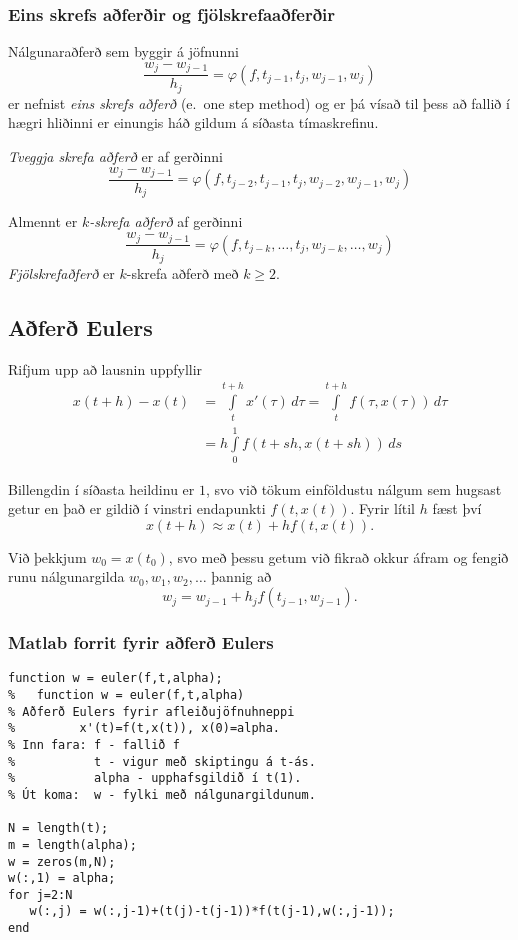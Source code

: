 \documentclass[icelandic,a4paper,12pt]{article}
\begin{document}
\subsubsection{Eins skrefs aðferðir og fjölskrefaaðferðir} 
Nálgunaraðferð sem byggir á jöfnunni
$$
  \dfrac{w_j-w_{j-1}}{h_j}=\varphi(f,t_{j-1},t_j,w_{j-1},w_j)
$$
er nefnist {\it eins skrefs aðferð} (e.~one step method) og er þá
vísað til þess að fallið í hægri hliðinni er einungis háð gildum á
síðasta tímaskrefinu.

\pause
\smallskip
{\it Tveggja skrefa aðferð} er af gerðinni
$$
  \dfrac{w_j-w_{j-1}}{h_j}=\varphi(f,t_{j-2},t_{j-1},t_j,w_{j-2},w_{j-1},w_j)
$$

\pause
\smallskip
Almennt er {\it $k$-skrefa aðferð} af gerðinni
$$
\dfrac{w_j-w_{j-1}}{h_j}=\varphi(f,t_{j-k},\dots,t_j,w_{j-k},\dots,w_j)
$$
{\it Fjölskrefaðferð} er  $k$-skrefa aðferð með $k\geq 2$.



\subsection{Aðferð Eulers} 
Rifjum upp að lausnin uppfyllir
\begin{align*}
  x(t+h) - x(t) &= \int\limits_t^{t+h} x'(\tau) \, d\tau
  = \int\limits_t^{t+h} f(\tau,x(\tau)) \, d\tau\\
&= h\int\limits_0^{1} f(t+sh,x(t+sh)) \, ds
\end{align*}

\pause
\smallskip
Billengdin í síðasta heildinu er $1$, svo við 
tökum einföldustu nálgum sem hugsast getur 
en það er gildið í vinstri endapunkti
$f(t,x(t))$.   Fyrir lítil $h$ fæst því 
\begin{equation*}
  x(t+h) \approx x(t) + hf(t,x(t)).
\end{equation*}

\pause
\smallskip
Við þekkjum $w_0=x(t_0)$, svo með þessu getum við fikrað okkur áfram
og  fengið runu nálgunargilda $w_0, w_1, w_2, \ldots$ þannig að
\begin{equation*}
  w_j = w_{j-1} + h_{j} f(t_{j-1},w_{j-1}).
\end{equation*}



\subsubsection{Matlab forrit fyrir aðferð Eulers} 
\begin{verbatim}
function w = euler(f,t,alpha);  
%   function w = euler(f,t,alpha) 
% Aðferð Eulers fyrir afleiðujöfnuhneppi 
%         x'(t)=f(t,x(t)), x(0)=alpha. 
% Inn fara: f - fallið f 
%           t - vigur með skiptingu á t-ás. 
%           alpha - upphafsgildið í t(1). 
% Út koma:  w - fylki með nálgunargildunum. 

N = length(t);   
m = length(alpha); 
w = zeros(m,N);  
w(:,1) = alpha; 
for j=2:N 
   w(:,j) = w(:,j-1)+(t(j)-t(j-1))*f(t(j-1),w(:,j-1));
end 
\end{verbatim}
\end{document}
